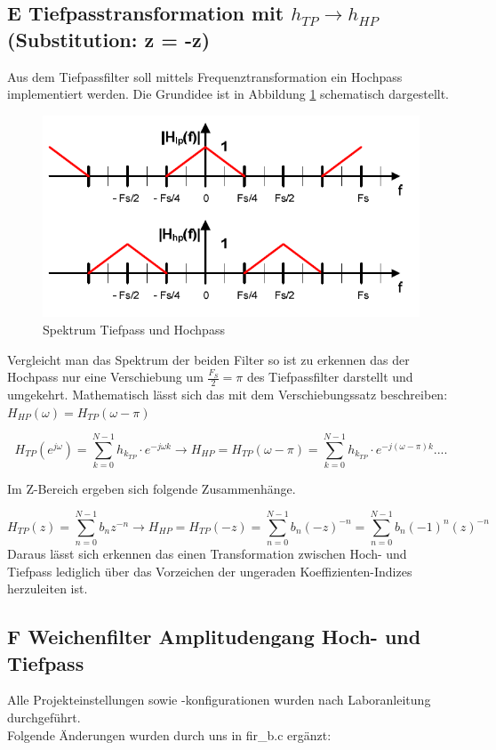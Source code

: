\clearpage

\subsection{E Tiefpasstransformation mit $h_{TP} \rightarrow h_{HP}$ (Substitution: z = -z)}
\noindent
Aus dem Tiefpassfilter soll mittels Frequenztransformation ein Hochpass implementiert werden. Die Grundidee ist in Abbildung 
\ref{fig:tiefpass_hochpass} schematisch dargestellt.

\begin{figure}[H]
\centering
\includegraphics[width=0.7\linewidth]{./Bilder/tiefpass_hochpass}
\caption{Spektrum Tiefpass und Hochpass}
\label{fig:tiefpass_hochpass}
\end{figure}

\noindent Vergleicht man das Spektrum der beiden Filter so ist zu erkennen das der Hochpass nur eine Verschiebung um $\frac{F_{S}}{2} = \pi$ des Tiefpassfilter darstellt und umgekehrt. Mathematisch lässt sich das mit dem Verschiebungssatz beschreiben: $H_{HP}(\omega) = H_{TP}(\omega-\pi)$

\begin{equation}
H_{TP}(e^{j\omega})= \sum_{k=0}^{N-1} h_{k_{TP}} \cdot e^{-j\omega k} \rightarrow H_{HP} = H_{TP}(\omega-\pi)= \sum_{k=0}^{N-1} h_{k_{TP}} \cdot e^{-j(\omega-\pi) k} ....
\end{equation}

\noindent Im Z-Bereich ergeben sich folgende Zusammenhänge.

\begin{equation}
H_{TP}(z)= \sum_{n=0}^{N-1} b_{n} z^{-n} \rightarrow H_{HP} = H_{TP}(-z)= \sum_{n=0}^{N-1} b_{n} (-z)^{-n} = \sum_{n=0}^{N-1} b_{n} (-1)^n(z)^{-n}
\end{equation}
Daraus lässt sich erkennen das einen Transformation zwischen  Hoch- und Tiefpass lediglich über das Vorzeichen der ungeraden Koeffizienten-Indizes herzuleiten ist.

\clearpage
\subsection{F Weichenfilter Amplitudengang Hoch- und Tiefpass}
\noindent \noindent Alle Projekteinstellungen sowie -konfigurationen wurden nach Laboranleitung durchgeführt. \\
\noindent Folgende Änderungen wurden durch uns in fir\_b.c ergänzt: \\


